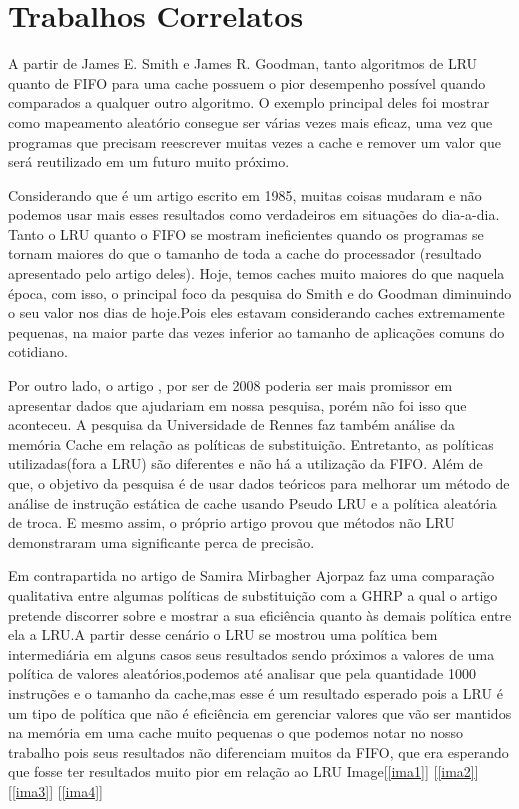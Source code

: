 \documentclass[conference]{IEEEtran}
\begin{document}
\section{Trabalhos Correlatos}


A partir de James E. Smith e James R. Goodman\cite{b1}, tanto algoritmos de LRU quanto de FIFO para
uma cache possuem o pior desempenho possível quando comparados a qualquer outro algoritmo. 
O exemplo principal deles foi mostrar como mapeamento aleatório consegue ser várias vezes mais eficaz, 
uma vez que programas que precisam reescrever muitas vezes a cache e remover um valor que será reutilizado 
em um futuro muito próximo.

Considerando que é um artigo escrito em 1985, muitas coisas mudaram e não podemos usar mais esses resultados
como verdadeiros em situações do dia-a-dia. Tanto o LRU quanto o FIFO se mostram ineficientes quando
os programas se tornam maiores do que o tamanho de toda a cache do processador (resultado apresentado pelo artigo
deles). Hoje, temos caches muito maiores do que naquela época, com isso, o principal foco da pesquisa do Smith e 
do Goodman diminuindo o seu valor nos dias de hoje.Pois eles estavam considerando caches extremamente pequenas, na maior 
parte das vezes inferior ao tamanho de aplicações comuns do cotidiano.

Por outro lado, o artigo \cite{b2}, por ser de 2008 poderia ser mais promissor em apresentar 
dados que ajudariam em nossa pesquisa, porém não foi isso que aconteceu. A pesquisa da Universidade de 
Rennes faz também análise da memória Cache em relação as políticas de substituição. Entretanto, as políticas 
utilizadas(fora a LRU) são diferentes e não há a utilização da FIFO. Além de que, o objetivo da pesquisa é de usar 
dados teóricos para melhorar um método de análise de instrução estática de cache usando Pseudo LRU e a política 
aleatória de troca. E mesmo assim, o próprio artigo provou que métodos não LRU demonstraram uma significante perca de precisão.

Em contrapartida no artigo de Samira Mirbagher Ajorpaz \cite{b3} faz uma comparação qualitativa entre algumas políticas de substituição
 com a GHRP a qual o artigo pretende discorrer sobre e mostrar a sua eficiência quanto às demais política entre ela a LRU.A partir
  desse cenário o LRU se mostrou uma política bem intermediária  em alguns casos seus resultados sendo  próximos a valores de uma 
  política de valores aleatórios,podemos até analisar que pela quantidade 1000 instruções e o tamanho da cache,mas esse é um resultado 
  esperado pois a LRU é um tipo de política que não é eficiência em gerenciar valores que vão ser mantidos na memória em uma cache muito 
  pequenas o que podemos notar no nosso trabalho  pois seus resultados não  diferenciam muitos da FIFO, que era esperando que fosse ter resultados
   muito pior em relação ao LRU Image[\ref{ima1}] [\ref{ima2}] [\ref{ima3}] [\ref{ima4}]
\end{document}
